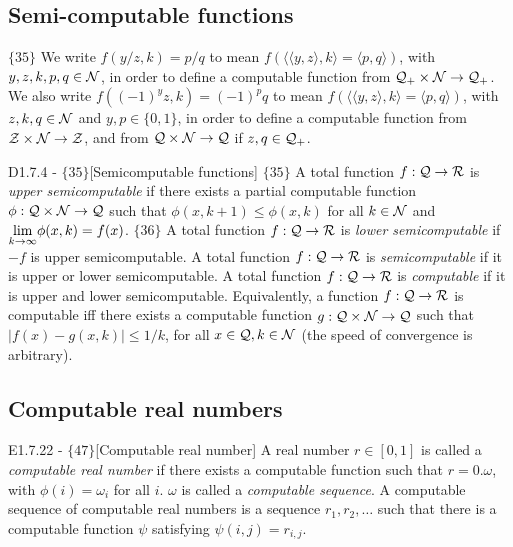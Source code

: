 \documentclass{article}
\begin{document}
\subsection{Semi-computable functions}

$\{35\}$ We write $f(y/z,k) = p/q$ to mean $f(\langle \langle y,z \rangle, k\rangle = \langle p,q \rangle)$, with $y,z,k,p,q \in \mathcal{N}$, in order to define a computable function from $\mathcal{Q}_+ \times \mathcal{N} \to \mathcal{Q}_+$. We also write $f((-1)^yz,k) = (-1)^pq$ to mean $f(\langle \langle y,z \rangle, k\rangle = \langle p,q \rangle)$, with $z,k,q \in \mathcal{N}$ and $y,p \in \{0,1\}$, in order to define a computable function from $\mathcal{Z} \times \mathcal{N} \to \mathcal{Z}$, and from $\mathcal{Q} \times \mathcal{N} \to \mathcal{Q}$ if $z,q \in \mathcal{Q}_+$. 

\begin{flexidefinition}{D1.7.4 - $\{35\}$}[Semicomputable functions]
    \label{def:semicomputable functions}
    $\{35\}$ A total function $f : \mathcal{Q} \to \mathcal{R}$ is \textit{upper semicomputable} if there exists a partial computable function $\phi : \mathcal{Q} \times \mathcal{N} \to \mathcal{Q}$ such that $\phi(x,k+1) \leq \phi(x,k)$ for all $k \in \mathcal{N}$ and $\underset{k \to \infty}{\lim} \phi(x,k) = f(x)$. $\{36\}$ A total function $f : \mathcal{Q} \to \mathcal{R}$ is \textit{lower semicomputable} if $-f$ is upper semicomputable. A total function $f : \mathcal{Q} \to \mathcal{R}$ is \textit{semicomputable} if it is upper or lower semicomputable. A total function $f : \mathcal{Q} \to \mathcal{R}$ is \textit{computable} if it is upper and lower semicomputable. Equivalently, a function $f : \mathcal{Q} \to \mathcal{R}$ is computable iff there exists a computable function $g : \mathcal{Q} \times \mathcal{N} \to \mathcal{Q}$ such that $|f(x) - g(x,k)| \leq 1/k$, for all $x \in \mathcal{Q}, k \in \mathcal{N}$ (the speed of convergence is arbitrary).
\end{flexidefinition}
\begin{figure}
    \centering
\end{figure}

\subsection{Computable real numbers}
\begin{flexidefinition}{E1.7.22 - $\{47 \}$}[Computable real number]
    A real number $r \in [0,1]$ is called a \textit{computable real number} if there exists a computable function such that $r = 0.\omega$, with $\phi(i) = \omega_i$ for all $i$. $\omega$ is called a \textit{computable sequence}. A computable sequence of computable real numbers is a sequence $r_1, r_2, \ldots$ such that there is a computable function $\psi$ satisfying $\psi(i,j) = r_{i,j}$.
\end{flexidefinition}
\end{document}

